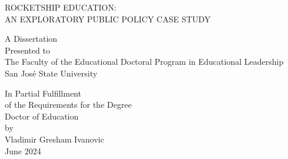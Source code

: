 
\begin{vplace}%
\begin{center}

  ROCKETSHIP EDUCATION:\\\vspace{1ex}
  AN EXPLORATORY PUBLIC POLICY CASE STUDY\\
\vspace{2\baselineskip}

A Dissertation\\
Presented to\\
The Faculty of the Educational Doctoral Program in Educational Leadership\\
San José State University\\
\vspace{2\baselineskip}

In Partial Fulfillment\\
of the Requirements for the Degree\\
Doctor of Education\\
\vspace{2\baselineskip}
by\\
Vladimir Gresham Ivanovic\\
June 2024\\


\end{center}
\end{vplace}

\thispagestyle{empty}

